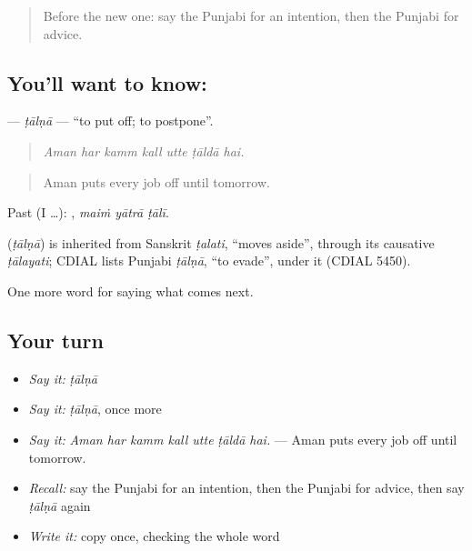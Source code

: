 \label{lesson:PA-C281-taalna}



\begin{quote}
Before the new one: say the Punjabi for an intention, then the Punjabi for advice.
\end{quote}

\subsection*{You'll want to know: }
\textbf{} — \emph{ṭālṇā} — \textquotedblleft{}to put off; to postpone\textquotedblright{}.

\begin{quote}
      
\end{quote}

\begin{quote}
\emph{Aman har kamm kall utte ṭāldā hai.}
\end{quote}

\begin{quote}
Aman puts every job off until tomorrow.
\end{quote}

Past (I …):   , \emph{maiṁ yātrā ṭālī}.

\begin{cousinweb}
\textbf{} (\emph{ṭālṇā}) is inherited from Sanskrit \emph{ṭalati}, \textquotedblleft{}moves aside\textquotedblright{}, through its causative \emph{ṭālayati}; CDIAL lists Punjabi \emph{ṭālṇā}, \textquotedblleft{}to evade\textquotedblright{}, under it (CDIAL 5450).
\end{cousinweb}

\begin{grammarlens}[title={What you've built}]
One more word for saying what comes next.
\end{grammarlens}

\subsection*{Your turn}
\begin{itemize}
\raggedright
  \item \emph{Say it:} \emph{ṭālṇā}
  \item \emph{Say it:} \emph{ṭālṇā}, once more
  \item \emph{Say it:} \emph{Aman har kamm kall utte ṭāldā hai.} — Aman puts every job off until tomorrow.
  \item \emph{Recall:} say the Punjabi for an intention, then the Punjabi for advice, then say \emph{ṭālṇā} again
  \item \emph{Write it:} copy \textbf{} once, checking the whole word
\end{itemize}

